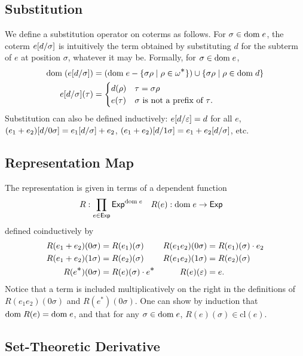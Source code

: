 \documentclass{article}
\newcommand\Exp{\mathsf{Exp}}
\renewcommand\star{^{\textstyle *}}
\newcommand\clname{\mathrm{cl}}
\newcommand\cl[1]{\clname(#1)}
\newcommand\repname{R}
\newcommand\repone[1]{\repname(#1)}
\newcommand\rep[2]{\repname(#2)(#1)}
\begin{document}
\subsection*{Substitution}

We define a substitution operator on coterms as follows. For $\sigma\in{\rm dom\;}e$, the coterm $e[d/\sigma]$ is intuitively the term obtained by substituting $d$ for the subterm of $e$ at position $\sigma$, whatever it may be. Formally, for $\sigma\in{\rm dom\;}e$,
\begin{align*}
\dom{(e\subst d\sigma)} &= (\dom e - \set{\sigma\rho}{\rho\in\omega\star})\cup\set{\sigma\rho}{\rho\in\dom d}\\
e\subst d\sigma(\tau) &= \begin{cases}
d(\rho) & \tau = \sigma\rho\\
e(\tau) & \text{$\sigma$ is not a prefix of $\tau$.}
\end{cases}
\end{align*}
Substitution can also be defined inductively: $e[d/\varepsilon] = d$ for all $e$, $(e_1+e_2)[d/0\sigma]=e_1[d/\sigma] + e_2$, $(e_1+e_2)[d/1\sigma]=e_1 + e_2[d/\sigma]$, etc.

\subsection*{Representation Map}

The representation is given in terms of a dependent function
\begin{align*}
\repname &: \prod_{e\in\Exp}\Exp^{\dom e} & \repone e &: \dom e\to\Exp
\end{align*}
defined coinductively by
\begin{align*}
\rep{0\sigma}{e_1+e_2} &= \rep\sigma{e_1} & \rep{0\sigma}{e_1e_2} &= \rep\sigma{e_1}\cdot e_2\\
\rep{1\sigma}{e_1+e_2} &= \rep\sigma{e_2} & \rep{1\sigma}{e_1e_2} &= \rep\sigma{e_2}\\
\rep{0\sigma}{e\star} &= \rep\sigma e\cdot e\star & \rep\eps e &= e.
\end{align*}
Notice that a term is included multiplicatively on the right in the definitions of $\rep{0\sigma}{e_1e_2}$ and $\rep{0\sigma}{e\star}$.
One can show by induction that $\dom{\repone e}=\dom e$, and that for any $\sigma\in{\rm dom\;}e$, $\rep\sigma e\in\cl e$.

\subsection*{Set-Theoretic Derivative}
\end{document}
